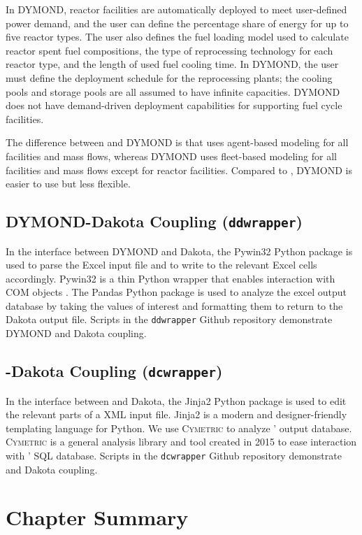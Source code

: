 In DYMOND, reactor facilities are automatically deployed to 
meet user-defined power demand, and the user can define 
the percentage share of energy for up to five reactor types. 
The user also defines the fuel loading model used to calculate 
reactor spent fuel compositions, the type of reprocessing 
technology for each reactor type, and the length 
of used fuel cooling time. 
In DYMOND, the user must define the deployment schedule for 
the reprocessing plants; the cooling pools and storage pools 
are all assumed to have infinite capacities. 
DYMOND does not have demand-driven deployment capabilities for 
supporting fuel cycle facilities. 

The difference between \Cyclus and DYMOND is that \Cyclus uses 
agent-based modeling for all facilities and mass flows, 
whereas DYMOND uses fleet-based modeling for all facilities and 
mass flows except for reactor facilities. 
Compared to \Cyclus, DYMOND is easier to use but less flexible. 

\subsection{DYMOND-Dakota Coupling (\texttt{ddwrapper})}
In the interface between DYMOND and Dakota, the Pywin32 
\cite{hammond_python_2000}
Python package is used to parse the Excel input file and to 
write to the relevant Excel cells accordingly. 
Pywin32 is a thin Python wrapper that enables interaction 
with COM objects \cite{hammond_python_2000}. 
The Pandas \cite{mckinney_pandas:_2011} Python
package is used to analyze the excel output database 
by taking the values of interest and formatting them 
to return to the Dakota output file.
Scripts in the \texttt{ddwrapper} Github repository \cite{chee_gwenchee/ddwrapper_2019}
demonstrate DYMOND and Dakota coupling. 

\subsection{\Cyclus-Dakota Coupling (\texttt{dcwrapper})}
In the interface between \Cyclus and Dakota, 
the Jinja2 \cite{ronacher_welcome_2018} Python package is used 
to edit the relevant parts of a \Cyclus XML input file. 
Jinja2 is a modern and designer-friendly templating 
language for Python. 
We use \textsc{Cymetric} to analyze \Cyclus' output database. 
\textsc{Cymetric} \cite{scopatz_cymetric_2015} is a general analysis library and 
tool created in 2015 to ease interaction with \Cyclus' SQL database. 
Scripts in the \texttt{dcwrapper} Github repository \cite{chee_arfc/dcwrapper_2019}
demonstrate \Cyclus and Dakota coupling. 


\section{Chapter Summary}



